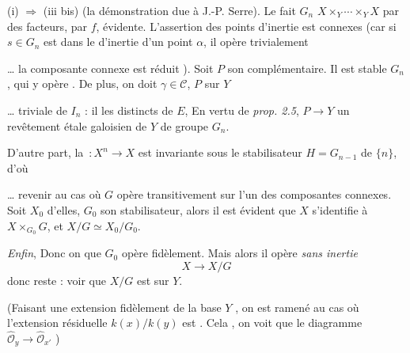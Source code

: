 \documentclass[11pt,a4paper]{article}
\begin{document}
(i) $\Rightarrow$ (iii bis) (la démonstration 
 due à J.-P. Serre). Le fait \ill{}
$G_n$ \ill{} $X \times_Y \cdots \times_Y X$ \ill{} par 
des facteurs, \ill{} par $f$, \ill{} évidente. L'assertion des points
d'inertie est   connexes
(car si $s \in G_n$ est dans le \ill{}
d'inertie d'un point $\alpha$, il opère trivialement \ill{}


\ldots{} \ill{} la composante connexe \ill{} est réduit ). Soit
$P$ son complémentaire. Il est stable 
\ill{} $G_n$, qui y opère \ill{}. De plus, on doit
\ill{}  $\gamma \in \mathcal{C}$, 
 $P$ sur $Y$ \ill{} \ill{}

\ldots{}  \ill{} triviale de $I_n$ : il \ill{}
les  \struck{\ill{}} distincts de $E$,
En vertu de \emph{prop. 2.5}, $P \to Y$ \ill{} un
revêtement étale galoisien de $Y$ de groupe $G_n$.

D'autre part, \struck{\ill{}} la \struck{\ill{}}  \ill{}
$\, : X^n \to X$  est invariante sous
le stabilisateur $H = G_{n-1}$ de $\{n\}$, d'où
\struck{\ill{}} \ill{}


\ldots{} revenir au cas où $G$ opère transitivement sur
l'un \ill{} des composantes connexes. Soit $X_0$ \ill{}
d'elles, $G_0$ son stabilisateur, alors il est
évident que $X$ s'identifie à $X \times_{G_0} G$,
et $X/G \simeq X_0/G_0$.

\emph{Enfin}, 
Donc on \ill{} que $G_0$ opère \ill{} fidèlement. Mais alors il
opère \emph{sans inertie}
\[
X \to X/G
\]
\ill{}
donc reste : voir que $X/G$ est  sur $Y$.

(Faisant une extension fidèlement \ill{} de la base $Y$ \ill{},
on est ramené au cas où l'extension résiduelle $k(x)/k(y)$ est
. Cela \ill{}, on voit que le diagramme
$\hat{\mathcal{O}}_y \to \hat{\mathcal{O}}_{x'}$ \ill{})

\end{document}
